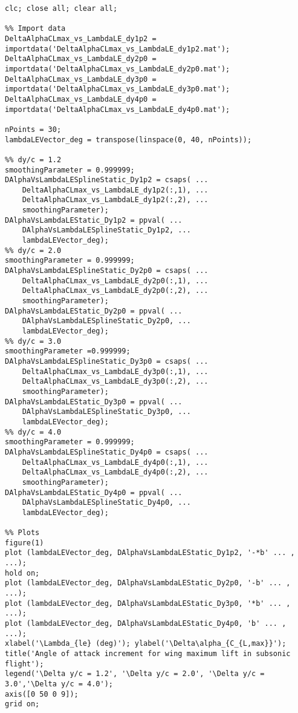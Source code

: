 \bigskip
\lstset{language=Matlab}
\begin{lstlisting}[caption={MATLAB script for creating the HDF Database}, captionpos=t, tabsize=2]
clc; close all; clear all;

%% Import data
DeltaAlphaCLmax_vs_LambdaLE_dy1p2 = importdata('DeltaAlphaCLmax_vs_LambdaLE_dy1p2.mat');
DeltaAlphaCLmax_vs_LambdaLE_dy2p0 = importdata('DeltaAlphaCLmax_vs_LambdaLE_dy2p0.mat');
DeltaAlphaCLmax_vs_LambdaLE_dy3p0 = importdata('DeltaAlphaCLmax_vs_LambdaLE_dy3p0.mat');
DeltaAlphaCLmax_vs_LambdaLE_dy4p0 = importdata('DeltaAlphaCLmax_vs_LambdaLE_dy4p0.mat');

nPoints = 30;
lambdaLEVector_deg = transpose(linspace(0, 40, nPoints));

%% dy/c = 1.2
smoothingParameter = 0.999999;
DAlphaVsLambdaLESplineStatic_Dy1p2 = csaps( ...
    DeltaAlphaCLmax_vs_LambdaLE_dy1p2(:,1), ...
    DeltaAlphaCLmax_vs_LambdaLE_dy1p2(:,2), ...
    smoothingParameter);
DAlphaVsLambdaLEStatic_Dy1p2 = ppval( ...
    DAlphaVsLambdaLESplineStatic_Dy1p2, ...
    lambdaLEVector_deg);
%% dy/c = 2.0
smoothingParameter = 0.999999; 
DAlphaVsLambdaLESplineStatic_Dy2p0 = csaps( ...
    DeltaAlphaCLmax_vs_LambdaLE_dy2p0(:,1), ...
    DeltaAlphaCLmax_vs_LambdaLE_dy2p0(:,2), ...
    smoothingParameter);
DAlphaVsLambdaLEStatic_Dy2p0 = ppval( ...
    DAlphaVsLambdaLESplineStatic_Dy2p0, ...
    lambdaLEVector_deg);
%% dy/c = 3.0
smoothingParameter =0.999999;
DAlphaVsLambdaLESplineStatic_Dy3p0 = csaps( ...
    DeltaAlphaCLmax_vs_LambdaLE_dy3p0(:,1), ...
    DeltaAlphaCLmax_vs_LambdaLE_dy3p0(:,2), ...
    smoothingParameter);
DAlphaVsLambdaLEStatic_Dy3p0 = ppval( ...
    DAlphaVsLambdaLESplineStatic_Dy3p0, ...
    lambdaLEVector_deg);
%% dy/c = 4.0
smoothingParameter = 0.999999; 
DAlphaVsLambdaLESplineStatic_Dy4p0 = csaps( ...
    DeltaAlphaCLmax_vs_LambdaLE_dy4p0(:,1), ...
    DeltaAlphaCLmax_vs_LambdaLE_dy4p0(:,2), ...
    smoothingParameter);
DAlphaVsLambdaLEStatic_Dy4p0 = ppval( ...
    DAlphaVsLambdaLESplineStatic_Dy4p0, ...
    lambdaLEVector_deg);

%% Plots
figure(1)
plot (lambdaLEVector_deg, DAlphaVsLambdaLEStatic_Dy1p2, '-*b' ... , ...);
hold on;
plot (lambdaLEVector_deg, DAlphaVsLambdaLEStatic_Dy2p0, '-b' ... , ...);
plot (lambdaLEVector_deg, DAlphaVsLambdaLEStatic_Dy3p0, '*b' ... , ...);
plot (lambdaLEVector_deg, DAlphaVsLambdaLEStatic_Dy4p0, 'b' ... , ...);
xlabel('\Lambda_{le} (deg)'); ylabel('\Delta\alpha_{C_{L,max}}');
title('Angle of attack increment for wing maximum lift in subsonic flight');
legend('\Delta y/c = 1.2', '\Delta y/c = 2.0', '\Delta y/c = 3.0','\Delta y/c = 4.0');
axis([0 50 0 9]);
grid on;
 

\end{lstlisting}
